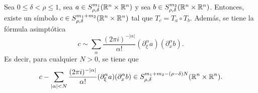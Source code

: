 \begin{theorem}
	Sea $0\leq\delta<\rho\leq1$, sea $a \in S^{m_1}_{\rho,\delta}(\mathbb{R}^n\times\mathbb{R}^n) $ y sea $ b\in S^{m_2}_{\rho,\delta}(\mathbb{R}^n\times\mathbb{R}^n) $. Entonces, existe un símbolo $ c\in S^{m_1+m_2}_{\rho,\delta}(\mathbb{R}^n\times\mathbb{R}^n)$ tal que 
	$T_c = T_a \circ T_b$. Además, se tiene la fórmula asimptótica 
	\begin{equation*}
		c \sim \sum_\alpha \frac{(2\pi i)^{-|\alpha|}}{\alpha!}(\partial^\alpha_\xi a)(\partial^\alpha_x b).
	\end{equation*}
	Es decir, para cualquier $N>0$, se tiene que 
	\begin{equation*}
		c - \sum_{|\alpha|<N} \frac{(2\pi i)^{-|\alpha|}}{\alpha!}(\partial^\alpha_\xi a)(\partial^\alpha_x b) \in S^{m_1+m_2-(\rho-\delta) N}_{\rho,\delta}(\mathbb{R}^n\times\mathbb{R}^n).
	\end{equation*}
\end{theorem}
